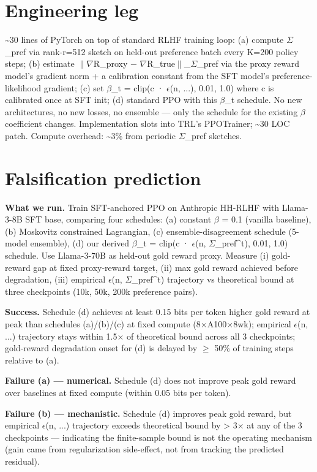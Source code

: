 \documentclass[10pt,a4paper]{article}
\begin{document}
\begin{tcolorbox}[colback=bgskill, colframe=cblue, title=\textbf{NoveltySkill — Idea Card (L3 Oral-Ready)}, breakable]
\section*{Engineering leg}
\textasciitilde{}30 lines of PyTorch on top of standard RLHF training loop: (a) compute $\Sigma$\_pref via rank-r=512 sketch on held-out preference batch every K=200 policy steps; (b) estimate $\|$$\nabla$R\_proxy − $\nabla$R\_true$\|$\_$\Sigma$\_pref via the proxy reward model's gradient norm + a calibration constant from the SFT model's preference-likelihood gradient; (c) set $\beta$\_t = clip(c · $\epsilon$(n, ...), 0.01, 1.0) where c is calibrated once at SFT init; (d) standard PPO with this $\beta$\_t schedule. No new architectures, no new losses, no ensemble --- only the schedule for the existing $\beta$ coefficient changes. Implementation slots into TRL's PPOTrainer; \textasciitilde{}30 LOC patch. Compute overhead: \textasciitilde{}3\% from periodic $\Sigma$\_pref sketches.

\section*{Falsification prediction}
\textbf{What we run.} Train SFT-anchored PPO on Anthropic HH-RLHF with Llama-3-8B SFT base, comparing four schedules: (a) constant $\beta$ = 0.1 (vanilla baseline), (b) Moskovitz constrained Lagrangian, (c) ensemble-disagreement schedule (5-model ensemble), (d) our derived $\beta$\_t = clip(c · $\epsilon$(n, $\Sigma$\_pref\textasciicircum{}t), 0.01, 1.0) schedule. Use Llama-3-70B as held-out gold reward proxy. Measure (i) gold-reward gap at fixed proxy-reward target, (ii) max gold reward achieved before degradation, (iii) empirical $\epsilon$(n, $\Sigma$\_pref\textasciicircum{}t) trajectory vs theoretical bound at three checkpoints (10k, 50k, 200k preference pairs).

\textbf{Success.} Schedule (d) achieves at least 0.15 bits per token higher gold reward at peak than schedules (a)/(b)/(c) at fixed compute (8$\times$A100$\times$8wk); empirical $\epsilon$(n, ...) trajectory stays within 1.5$\times$ of theoretical bound across all 3 checkpoints; gold-reward degradation onset for (d) is delayed by $\ge$ 50\% of training steps relative to (a).

\textbf{Failure (a) — numerical.} Schedule (d) does not improve peak gold reward over baselines at fixed compute (within 0.05 bits per token).

\textbf{Failure (b) — mechanistic.} Schedule (d) improves peak gold reward, but empirical $\epsilon$(n, ...) trajectory exceeds theoretical bound by > 3$\times$ at any of the 3 checkpoints --- indicating the finite-sample bound is not the operating mechanism (gain came from regularization side-effect, not from tracking the predicted residual).


\end{tcolorbox}
\end{document}
